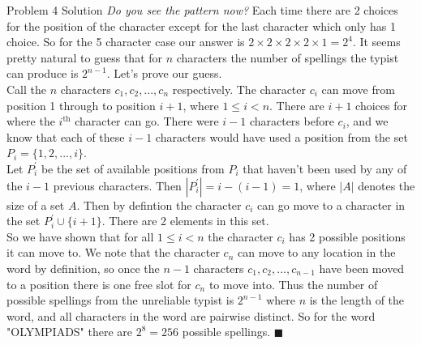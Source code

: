 \documentclass{article}
\begin{document}
\begin{solution}{Problem 4 Solution}
\textit{Do you see the pattern now?} Each time there are 2 choices for the position of the character except for the last character which only has 1 choice.
So for the 5 character case our answer is $2\times 2\times 2\times 2 \times 1 = 2^4$.
It seems pretty natural to guess that for $n$ characters the number of spellings the typist can produce is $2^{n-1}$. Let's prove our guess.\\

Call the $n$ characters
$c_1, c_2, ..., c_n$ respectively. The character $c_i$ can move from position 1 through to position $i+1$, where $1\leq i<n$. There are $i+1$ choices for where
the $i^\text{th}$ character can go.
There were $i-1$ characters before $c_i$, and we know that each of these $i-1$ characters would have used a position from the set $P_i = \{1,2,...,i\}$.\\

Let $P_i^{'}$ be the set of available positions from $P_i$ that haven't been used by any of the $i-1$ previous characters. Then $\left| P_i^{'} \right| = i - (i-1) = 1$,
where $\left|A\right|$ denotes the size of a set $A$. Then by defintion the character $c_i$ can go move to a character in the set $P_i^{'} \cup \{i+1\}$. There are 2
elements in this set. \\

So we have shown that for all $1 \leq i < n$ the character $c_i$ has 2 possible positions it can move to. We note that the character $c_n$ can move to any location in
the word by definition, so once the $n-1$ characters $c_1, c_2, ..., c_{n-1}$ have been moved to a position there is one free slot for $c_n$ to move into. Thus the number
of possible spellings from the unreliable typist is $2^{n-1}$ where $n$ is the length of the word, and all characters in the word are pairwise distinct.
So for the word "OLYMPIADS" there are $2^8 = \boxed{256}$ possible spellings. $\blacksquare$
\end{solution}
\vspace{0.7cm}
\end{document}
